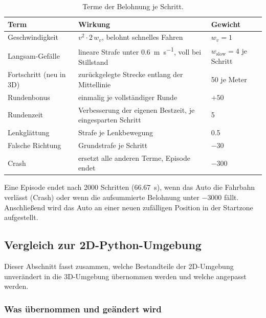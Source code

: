 \begin{table}[htbp]
  \centering
  \caption{Terme der Belohnung je Schritt.}
  \label{tab:3d_belohnung}
  \small
  \begin{tabularx}{\linewidth}{@{}l X l@{}}
    \toprule
    \textbf{Term} & \textbf{Wirkung} & \textbf{Gewicht} \\
    \midrule
    Geschwindigkeit         & $v^2 \cdot 2\,w_v$, belohnt schnelles Fahren & $w_v = 1$ \\
    Langsam-Gefälle         & lineare Strafe unter \SI{0.6}{\meter\per\second}, voll bei Stillstand & $w_{\text{slow}} = 4$ je Schritt \\
    Fortschritt (neu in 3D) & zurückgelegte Strecke entlang der Mittellinie & \num{50} je Meter \\
    Rundenbonus             & einmalig je vollständiger Runde & $+50$ \\
    Rundenzeit              & Verbesserung der eigenen Bestzeit, je eingesparten Schritt & \num{5} \\
    Lenkglättung            & Strafe je Lenkbewegung & \num{0.5} \\
    Falsche Richtung        & Grundstrafe je Schritt & $-30$ \\
    Crash                   & ersetzt alle anderen Terme, Episode endet & $-300$ \\
    \bottomrule
  \end{tabularx}
\end{table}

Eine Episode endet nach \num{2000} Schritten (\SI{66.67}{\second}), wenn das Auto die Fahrbahn verlässt (Crash) oder wenn die aufsummierte Belohnung unter $-3000$ fällt. Anschließend wird das Auto an einer neuen zufälligen Position in der Startzone aufgestellt.

\subsection{Vergleich zur 2D-Python-Umgebung}
\label{sec:3d_vergleich2d}

Dieser Abschnitt fasst zusammen, welche Bestandteile der 2D-Umgebung unverändert in die 3D-Umgebung übernommen werden und welche angepasst werden.

\subsubsection{Was übernommen und geändert wird}
\label{subsec:3d_uebernommen_geaendert}


